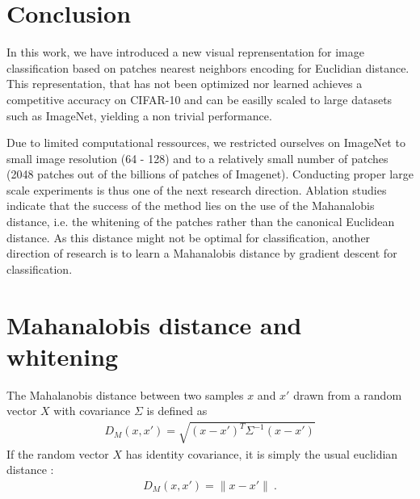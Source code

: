 \documentclass{article}
\newcommand{\Edouard}[1]{\textcolor{blue}{#1}}
\begin{document}
\section{Conclusion}

In this work, we have introduced a new visual reprensentation for image classification based on patches nearest neighbors encoding for Euclidian distance.
This representation, that has not been optimized nor learned achieves a competitive accuracy on CIFAR-10 and can be easilly scaled to large datasets such as ImageNet, yielding a non trivial performance.%


Due to limited computational ressources, we restricted ourselves on ImageNet to small image resolution (64 - 128) and to a relatively small number of patches (2048 patches out of the billions of patches of  Imagenet).
Conducting proper large scale experiments is thus one of the next research direction.
Ablation studies indicate that the success of the method lies on the use of the Mahanalobis distance, i.e. the whitening of the patches rather than the canonical Euclidean distance.
As this distance might not be optimal for classification, another direction of research is to learn a Mahanalobis distance by gradient descent for classification.





{}

\newpage

\appendix

\section{Mahanalobis distance and whitening}

The Mahalanobis distance \citep{chandra1936generalised, mclachlan1999mahalanobis} between two samples $x$ and $x'$ drawn from a random vector $X$ with covariance $\Sigma$ is defined as  
\begin{align*} D_M (x, x' ) =  \sqrt{ (x - x')^T \Sigma^{-1} (x - x')} \end{align*}
If the random vector $X$ has identity covariance, it is simply the usual euclidian distance : 
\begin{align*} D_M (x, x' ) =  \| x - x' \| \ .\end{align*}
\end{document}
